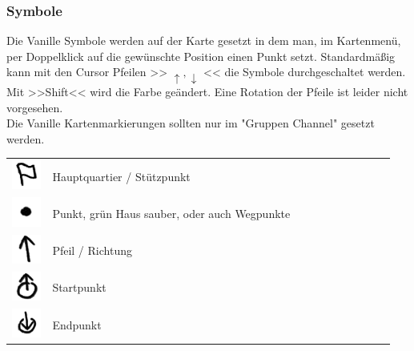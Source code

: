 \newpage
\subsubsection{Symbole}
Die Vanille Symbole werden auf der Karte gesetzt in dem man, im Kartenmenü, per Doppelklick auf die gewünschte Position einen Punkt setzt. Standardmäßig kann mit den Cursor Pfeilen >> \begin{math} \uparrow,\downarrow \end{math} << die Symbole durchgeschaltet werden. Mit >>Shift<< wird die Farbe geändert. Eine Rotation der Pfeile ist leider nicht vorgesehen. \\
Die Vanille Kartenmarkierungen sollten nur im "Gruppen Channel" gesetzt werden.

\begin{longtable}{C{0.1\linewidth} m{0.85\linewidth}}
	\includegraphics[scale=0.8]{./img/fortgeschrittenes/karteUndMarkierungen/HQ.png}	& 	Hauptquartier / Stützpunkt \\
	\includegraphics[scale=0.8]{./img/fortgeschrittenes/karteUndMarkierungen/Punkt.png}	&	Punkt, grün Haus sauber, oder auch Wegpunkte \\
	\includegraphics[scale=0.8]{./img/fortgeschrittenes/karteUndMarkierungen/Pfeil.png}	&	Pfeil / Richtung \\
	\includegraphics[scale=0.8]{./img/fortgeschrittenes/karteUndMarkierungen/Start.png}	&	Startpunkt \\
	\includegraphics[scale=0.8]{./img/fortgeschrittenes/karteUndMarkierungen/Endpunkt.png}	&	Endpunkt \\

\end{longtable}
